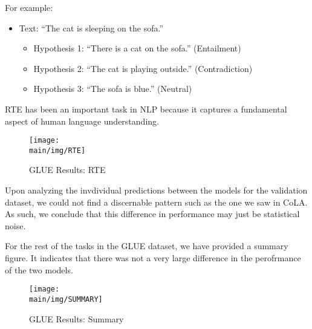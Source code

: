 \documentclass[\main/thesis.tex]{subfiles}
\begin{document}
For example:
\begin{itemize}
    \item Text: ``The cat is sleeping on the sofa.''
    \begin{itemize}
        \item Hypothesis 1: ``There is a cat on the sofa.'' (Entailment)
        \item Hypothesis 2: ``The cat is playing outside.'' (Contradiction)
        \item Hypothesis 3: ``The sofa is blue.'' (Neutral)
    \end{itemize}
\end{itemize}

RTE has been an important task in NLP because it captures a fundamental aspect of human language understanding. 

\begin{figure}
    \texttt{[image: \\main/img/RTE]}
    \caption[GLUE Results: RTE] {GLUE Results: RTE}
    \label{fig:rte_fig}
\end{figure}

Upon analyzing the invdividual predictions between the models for the validation dataset,
we could not find a discernable pattern such as the one we saw in CoLA.
As such, we conclude that this difference in performance may just be statistical noise. 

For the rest of the tasks in the GLUE dataset, we have provided a summary figure. It indicates 
that there was not a very large difference in the perofrmance of the two models. 

\begin{figure}
    \texttt{[image: \\main/img/SUMMARY]}
    \caption[GLUE Results: Summary] {GLUE Results: Summary}
    \label{fig:rte_fig}
\end{figure}
\end{document}
